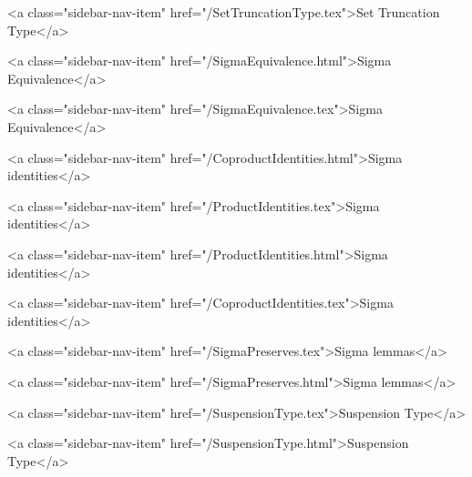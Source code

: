       
    
      
        
          <a class="sidebar-nav-item" href="/SetTruncationType.tex">Set Truncation Type</a>
        
      
    
      
        
          <a class="sidebar-nav-item" href="/SigmaEquivalence.html">Sigma Equivalence</a>
        
      
    
      
        
          <a class="sidebar-nav-item" href="/SigmaEquivalence.tex">Sigma Equivalence</a>
        
      
    
      
        
          <a class="sidebar-nav-item" href="/CoproductIdentities.html">Sigma identities</a>
        
      
    
      
        
          <a class="sidebar-nav-item" href="/ProductIdentities.tex">Sigma identities</a>
        
      
    
      
        
          <a class="sidebar-nav-item" href="/ProductIdentities.html">Sigma identities</a>
        
      
    
      
        
          <a class="sidebar-nav-item" href="/CoproductIdentities.tex">Sigma identities</a>
        
      
    
      
        
          <a class="sidebar-nav-item" href="/SigmaPreserves.tex">Sigma lemmas</a>
        
      
    
      
        
          <a class="sidebar-nav-item" href="/SigmaPreserves.html">Sigma lemmas</a>
        
      
    
      
        
          <a class="sidebar-nav-item" href="/SuspensionType.tex">Suspension Type</a>
        
      
    
      
        
          <a class="sidebar-nav-item" href="/SuspensionType.html">Suspension Type</a>
        
